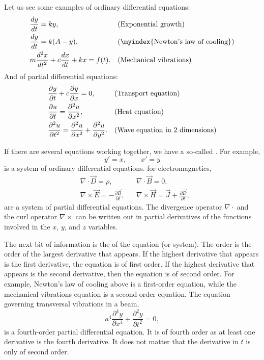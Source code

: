 Let us see some examples of ordinary differential equations:
\begin{align*}
& \frac{d y}{dt} = ky , & & \text{(Exponential growth\index{exponential growth})} \\
& \frac{d y}{dt} = k(A-y) , & & \text{(\myindex{Newton's law of cooling})} \\
& m \frac{d^2 x}{dt^2} + c \frac{dx}{dt} + kx = f(t) . & &
\text{(Mechanical vibrations\index{mechanical vibrations})}
\end{align*}
And of partial differential equations:
\begin{align*}
& \frac{\partial y}{\partial t} + c \frac{\partial y}{\partial x} = 0 , & & 
\text{(Transport equation\index{transport equation})} \\
& \frac{\partial u}{\partial t} = \frac{\partial^2 u}{\partial x^2} , & & 
\text{(Heat equation\index{heat equation})} \\
& \frac{\partial^2 u}{\partial t^2} = \frac{\partial^2 u}{\partial x^2} +
\frac{\partial^2 u}{\partial y^2} . & & 
\text{(Wave equation in 2 dimensions\index{wave equation in 2 dimensions})}
\end{align*}

If there are several equations working together, we have a so-called
\emph{}.  For example,
\begin{equation*}
y' = x , \qquad x' = y
\end{equation*}
is a system of ordinary differential equations.
 for electromagnetics,
\begin{align*}
& \nabla \cdot \vec{D} = \rho, & & \nabla \cdot \vec{B} = 0 , \\
& \nabla \times \vec{E} = - \frac{\partial \vec{B}}{\partial t}, &
& \nabla \times \vec{H} = \vec{J} + \frac{\partial \vec{D}}{\partial t} ,
\end{align*}
are a system of partial differential equations. 
The divergence operator $\nabla \cdot$ and the
curl operator $\nabla \times$ can be written out in partial derivatives of
the functions involved in the $x$, $y$, and $z$ variables.

\medskip

The next bit of information is the \emph{} of the
equation (or system).  The order is the order of the largest
derivative that appears.  If the highest derivative that appears is
the first derivative, the equation is of first order.  If the highest
derivative that appears is the second derivative, then the equation is of second
order.  For example, Newton's law of cooling above is a first-order
equation, while the mechanical vibrations equation is a second-order equation.
The equation governing transversal vibrations in a beam,
\begin{equation*}
a^4 \frac{\partial^4 y}{\partial x^4} + \frac{\partial^2 y}{\partial t^2} = 0,
\end{equation*}
is a fourth-order partial differential equation.  It is of
fourth order as at least one derivative is the fourth derivative.  It
does not matter that the derivative in $t$ is only of second order.

